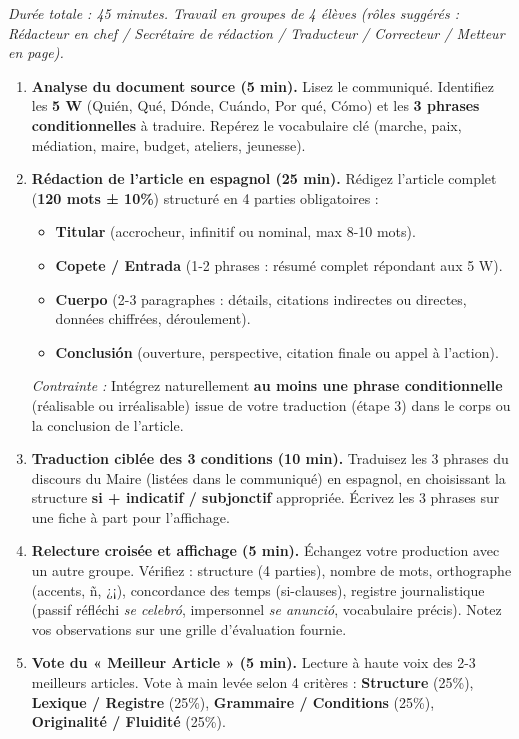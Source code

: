 \documentclass[11pt]{article}
\newcounter{popsec}
\newcounter{popsub}
\newcommand{\courssub}[1]{%
  \stepcounter{popsub}%
  \par\vspace{9pt}\noindent{\popxbold\fontsize{11.5}{13}\selectfont\color{popink}{\color{poporange}\thepopsec.\thepopsub}\hspace{6pt}#1}\par\nopagebreak\vspace{4pt}
}
\begin{document}
\courssub{Consignes}
\emph{Durée totale : 45 minutes. Travail en groupes de 4 élèves (rôles suggérés : Rédacteur en chef / Secrétaire de rédaction / Traducteur / Correcteur / Metteur en page).}

\begin{enumerate}
    \item \textbf{Analyse du document source (5 min).} Lisez le communiqué. Identifiez les \textbf{5 W} (Quién, Qué, Dónde, Cuándo, Por qué, Cómo) et les \textbf{3 phrases conditionnelles} à traduire. Repérez le vocabulaire clé (marche, paix, médiation, maire, budget, ateliers, jeunesse).
    
    \item \textbf{Rédaction de l'article en espagnol (25 min).} Rédigez l'article complet (\textbf{120 mots ± 10\%}) structuré en 4 parties obligatoires :
    \begin{itemize}
        \item \textbf{Titular} (accrocheur, infinitif ou nominal, max 8-10 mots).
        \item \textbf{Copete / Entrada} (1-2 phrases : résumé complet répondant aux 5 W).
        \item \textbf{Cuerpo} (2-3 paragraphes : détails, citations indirectes ou directes, données chiffrées, déroulement).
        \item \textbf{Conclusión} (ouverture, perspective, citation finale ou appel à l'action).
    \end{itemize}
    \emph{Contrainte :} Intégrez naturellement \textbf{au moins une phrase conditionnelle} (réalisable ou irréalisable) issue de votre traduction (étape 3) dans le corps ou la conclusion de l'article.
    
    \item \textbf{Traduction ciblée des 3 conditions (10 min).} Traduisez les 3 phrases du discours du Maire (listées dans le communiqué) en espagnol, en choisissant la structure \textbf{si + indicatif / subjonctif} appropriée. Écrivez les 3 phrases sur une fiche à part pour l'affichage.
    
    \item \textbf{Relecture croisée et affichage (5 min).} Échangez votre production avec un autre groupe. Vérifiez : structure (4 parties), nombre de mots, orthographe (accents, ñ, ¿¡), concordance des temps (si-clauses), registre journalistique (passif réfléchi \emph{se celebró}, impersonnel \emph{se anunció}, vocabulaire précis). Notez vos observations sur une grille d'évaluation fournie.
    
    \item \textbf{Vote du « Meilleur Article » (5 min).} Lecture à haute voix des 2-3 meilleurs articles. Vote à main levée selon 4 critères : \textbf{Structure} (25\%), \textbf{Lexique / Registre} (25\%), \textbf{Grammaire / Conditions} (25\%), \textbf{Originalité / Fluidité} (25\%).
\end{enumerate}
\end{document}
